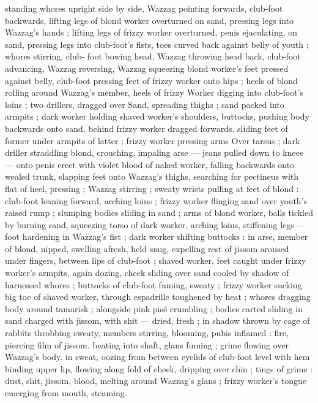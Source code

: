 standing whores upright side by side, Wazzag pointing forwards, 
club-foot backwards, lifting legs of blond worker overturned on 
sand, pressing legs into Wazzag's hands ; lifting legs of frizzy worker 
overturned, penis ejaculating, on sand, pressing legs into club-foot's 
fists, toes curved back against belly of youth ; whores stirring, club- 
foot bowing head, Wazzag throwing head back, club-foot advancing, 
Wazzag reversing, Wazzag squeezing blond worker's feet pressed 
against belly, club-foot pressing feet of frizzy worker onto hips ; 
heels of blond rolling around Wazzag's member, heels of frizzy 
Worker digging into club-foot's loins ; two drillers, dragged over 
Sand, spreading thighs ; sand packed into armpits ; dark worker 
holding shaved worker's shoulders, buttocks, pushing body 
backwards onto sand, behind frizzy worker dragged forwards. sliding 
feet of former under armpits of latter ; frizzy worker pressing arms 
Over tarsus ; dark driller straddling blond, crouching, impaling arse 
--- jeans pulled down to knees --- onto penis erect with violet blood 
of naked worker, falling backwards onto wealed trunk, slapping feet 
onto Wazzag's thighs, searching for pectineus with flat of heel, 
pressing ; Wazzag stirring ; sweaty wrists pulling at feet of blond : 
club-foot leaning forward, arching loins ; frizzy worker flinging sand 
over youth's raised rump ; slumping bodies sliding in sand ; arms of 
blond worker, balls tickled by burning sand, squeezing torso of dark 
worker, arching loins, stiffening legs --- foot hardening in Wazzag's 
fist ; dark worker shifting buttocks : in arse, member of blond, 
nipped, swelling afresh, held snug, expelling rest of jissom aroused 
under fingers, between lips of club-foot ; shaved worker, feet caught 
under frizzy worker's armpits, again dozing, cheek sliding over sand 
cooled by shadow of harnessed whores ; buttocks of club-foot 
fuming, sweaty ; frizzy worker sucking big toe of shaved worker, 
through espadrille toughened by heat ; whores dragging body 
around tamarisk ; alongside pink pisé crumbling ; bodies carted 
sliding in sand charged with jissom, with shit --- dried, fresh ; in 
shadow thrown by cage of rabbits throbbing sweaty, members 
stirring, blooming, pubis inflamed : fire, piercing film of jissom. 
beating into shaft, glans fuming ; grime flowing over Wazzag's body. 
in sweat, oozing from between eyelids of club-foot level with hem 
binding upper lip, flowing along fold of cheek, dripping over chin ; 
tings of grime : dust, shit, jissom, blood, melting around Wazzag's 
glans ; frizzy worker's tongue emerging from mouth, steaming. 
